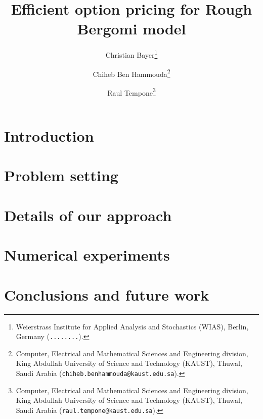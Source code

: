 \documentclass[11pt]{article}
\title{Efficient option pricing for Rough Bergomi model}
\author{Christian Bayer\thanks{
 Weierstrass Institute for Applied Analysis and Stochastics (WIAS),
 Berlin, Germany ({\tt........}).}
        \and Chiheb Ben Hammouda\thanks{Computer, Electrical and Mathematical Sciences and Engineering division,
 King Abdullah University of Science and Technology (KAUST),
 Thuwal, Saudi Arabia ({\tt chiheb.benhammouda@kaust.edu.sa}).} 
\and  Raul Tempone\thanks{Computer, Electrical and Mathematical Sciences and Engineering division,
 King Abdullah University of Science and Technology (KAUST),
 Thuwal, Saudi Arabia ({\tt raul.tempone@kaust.edu.sa}).}}
\begin{document}
\maketitle

\begin{abstract}
	  
\end{abstract}





\thispagestyle{plain}

\setcounter{tocdepth}{1}


 \section{Introduction}




 \section{Problem setting}\label{sec:Problem setting}




\section{Details of our approach}\label{sec:Details our approach and error bounds}





\section{Numerical experiments}\label{sec:Numerical tests}




\section{Conclusions and future work}




 




\appendix







 

 

 
 
 
\end{document}
